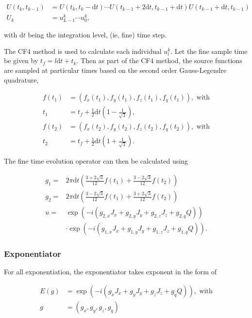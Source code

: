 \documentclass{jors}
\begin{document}
			\begin{align*}
				U(t_k, t_{k-1}) &= U(t_k, t_k - \mathrm{d}t) \cdots U(t_{k-1} + 2\mathrm{d}t, t_{k-1} + \mathrm{d}t) U(t_{k-1} + \mathrm{d}t, t_{k-1})\\
				U_k &= u^k_{L-1} \cdots u^k_0,
			\end{align*}
			
			with \(\mathrm{d}t\) being the integration level, (ie, fine) time step.

			The CF4 method is used to calculate each individual \(u^k_l\). Let the fine sample time be given by \(t_f = l\mathrm{d}t + t_k\). Then as part of the CF4 method, the source functions are sampled at particular times based on the second order Gauss-Legendre quadrature,
			
			\begin{align*}
				f(t_1) &= (f_x(t_1), f_y(t_1), f_z(t_1), f_q(t_1)), \textrm{ with}\\
				t_1 &= t_f + \frac12 \mathrm{d}t\left(1 - \frac{1}{\sqrt{3}}\right),\\
				f(t_2) &= (f_x(t_2), f_y(t_2), f_z(t_2), f_q(t_2)), \textrm{ with}\\
				t_2 &= t_f + \frac12 \mathrm{d}t\left(1 + \frac{1}{\sqrt{3}}\right).
			\end{align*}
			
			The fine time evolution operator can then be calculated using
			
			\begin{align*}
				g_1 =& 2 \pi \mathrm{d}t \left(\frac{3 + 2 \sqrt{3}}{12} f(t_1) + \frac{3 - 2 \sqrt{3}}{12} f(t_2)\right)\\
				g_2 =& 2 \pi \mathrm{d}t \left(\frac{3 - 2 \sqrt{3}}{12} f(t_1) + \frac{3 + 2 \sqrt{3}}{12} f(t_2)\right)\\
				u =& \exp(-i \left( g_{2,x} J_x + g_{2,y} J_y + g_{2,z} J_z + g_{2,q} Q\right))\\
				&\cdot\exp(-i \left( g_{1,x} J_x + g_{1,y} J_y + g_{1,z} J_z + g_{1,q} Q\right)).
			\end{align*}

		\subsubsection*{Exponentiator}
			For all exponentiation, the exponentiator takes exponent in the form of
			
			\begin{align*}
				E(g) &= \exp(-i (g_x J_x + g_y J_y + g_z J_z + g_q Q)), \textrm{ with}\\
				g &= (g_x, g_y, g_z, g_q)
			\end{align*}
			
\end{document}
